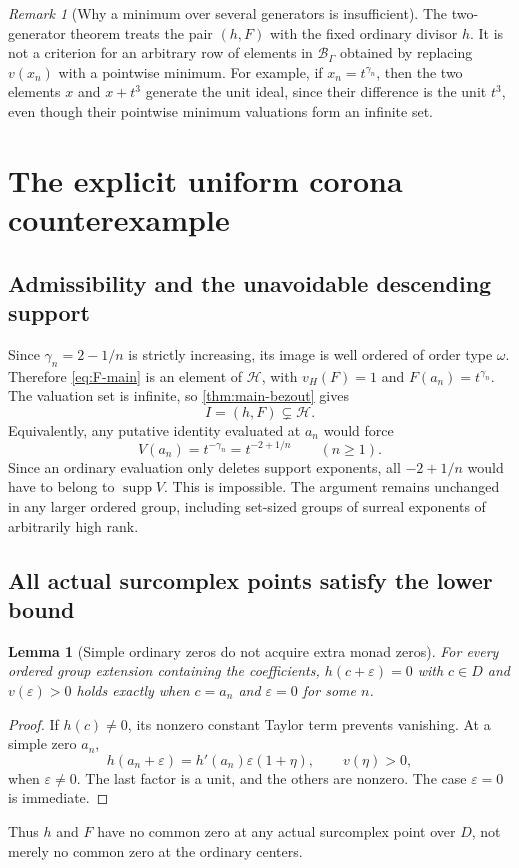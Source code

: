 \documentclass[11pt,letterpaper]{article}
\numberwithin{equation}{section}
\newtheorem{lemma}[theorem]{Lemma}
\theoremstyle{definition}
\theoremstyle{remark}
\newtheorem{remark}[theorem]{Remark}
\newcommand{\HH}{\mathcal H}
\newcommand{\BB}{\mathcal B}
\newcommand{\vH}{v_{\!H}}
\newcommand{\supp}{\operatorname{supp}}
\begin{document}
\begin{remark}[Why a minimum over several generators is insufficient]
The two-generator theorem treats the pair $(h,F)$ with the fixed ordinary
divisor $h$. It is not a criterion for an arbitrary row of elements in
$\BB_\Gamma$ obtained by replacing $v(x_n)$ with a pointwise minimum.
For example, if $x_n=t^{\gamma_n}$, then the two elements $x$ and
$x+t^3$ generate the unit ideal, since their difference is the unit $t^3$,
even though their pointwise minimum valuations form an infinite set.
\end{remark}

\section{The explicit uniform corona counterexample}\label{sec:corona}

\subsection{Admissibility and the unavoidable descending support}
Since $\gamma_n=2-1/n$ is strictly increasing, its image is well ordered
of order type $\omega$. Therefore \eqref{eq:F-main} is an element of
$\HH$, with $\vH(F)=1$ and $F(a_n)=t^{\gamma_n}$. The valuation set is
infinite, so \cref{thm:main-bezout} gives
\begin{equation}\label{eq:proper-I}
 I=(h,F)\subsetneq\HH.
\end{equation}
Equivalently, any putative identity evaluated at $a_n$ would force
\[
 V(a_n)=t^{-\gamma_n}=t^{-2+1/n}\qquad(n\ge1).
\]
Since an ordinary evaluation only deletes support exponents, all
$-2+1/n$ would have to belong to $\supp V$. This is impossible. The
argument remains unchanged in any larger ordered group, including
set-sized groups of surreal exponents of arbitrarily high rank.

\subsection{All actual surcomplex points satisfy the lower bound}
\begin{lemma}[Simple ordinary zeros do not acquire extra monad zeros]
\label{lem:hzeros}
For every ordered group extension containing the coefficients,
$h(c+\varepsilon)=0$ with $c\in D$ and $v(\varepsilon)>0$ holds exactly
when $c=a_n$ and $\varepsilon=0$ for some $n$.
\end{lemma}
\begin{proof}
If $h(c)\ne0$, its nonzero constant Taylor term prevents vanishing.
At a simple zero $a_n$,
\[
 h(a_n+\varepsilon)=h'(a_n)\varepsilon(1+\eta),
 \qquad v(\eta)>0,
\]
when $\varepsilon\ne0$. The last factor is a unit, and the others are
nonzero. The case $\varepsilon=0$ is immediate.
\end{proof}
Thus $h$ and $F$ have no common zero at any actual surcomplex point over
$D$, not merely no common zero at the ordinary centers.
\end{document}
